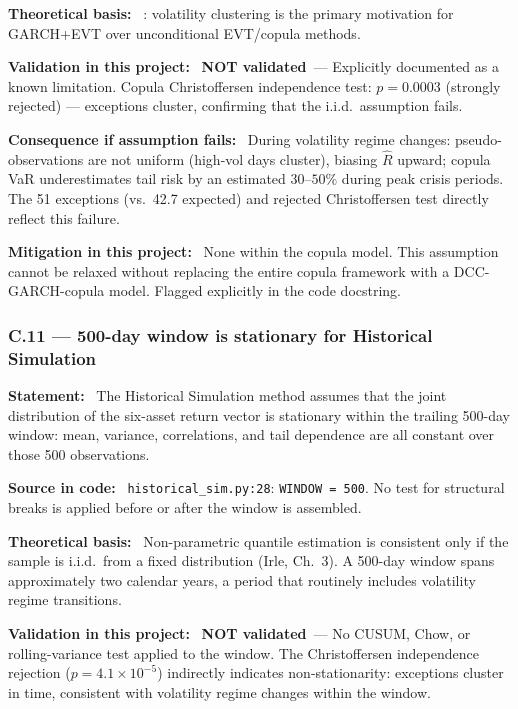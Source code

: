 \documentclass[11pt,a4paper]{article}
\newcommand{\asmfield}[1]{\medskip\noindent\textbf{#1:}\ }
\newcommand{\code}[1]{\texttt{#1}}
\newcommand{\notvalidated}{\textbf{NOT validated}}
\begin{document}
\asmfield{Theoretical basis}
\cite{McNeilFrey2000}: volatility clustering is the primary motivation for
GARCH+EVT over unconditional EVT/copula methods.

\asmfield{Validation in this project}
\notvalidated\ --- Explicitly documented as a known limitation. Copula
Christoffersen independence test: $p = 0.0003$ (strongly rejected) ---
exceptions cluster, confirming that the i.i.d.\ assumption fails.

\asmfield{Consequence if assumption fails}
During volatility regime changes: pseudo-observations are not uniform (high-vol
days cluster), biasing $\hat{R}$ upward; copula VaR underestimates tail
risk by an estimated $30$--$50\%$ during peak crisis periods. The 51
exceptions (vs.\ 42.7 expected) and rejected Christoffersen test directly
reflect this failure.

\asmfield{Mitigation in this project}
None within the copula model. This assumption cannot be relaxed without
replacing the entire copula framework with a DCC-GARCH-copula model.
Flagged explicitly in the code docstring.

\subsubsection{C.11 --- 500-day window is stationary for Historical Simulation}\label{asm:C11}

\asmfield{Statement}
The Historical Simulation method assumes that the joint distribution of
the six-asset return vector is stationary within the trailing 500-day
window: mean, variance, correlations, and tail dependence are all constant
over those 500 observations.

\asmfield{Source in code}
\code{historical\_sim.py:28}: \lstinline|WINDOW = 500|. No test for
structural breaks is applied before or after the window is assembled.

\asmfield{Theoretical basis}
Non-parametric quantile estimation is consistent only if the sample is
i.i.d.\ from a fixed distribution (Irle, Ch.~3). A 500-day window spans
approximately two calendar years, a period that routinely includes
volatility regime transitions.

\asmfield{Validation in this project}
\notvalidated\ --- No CUSUM, Chow, or rolling-variance test applied to
the window. The Christoffersen independence rejection
($p = 4.1 \times 10^{-5}$) indirectly indicates non-stationarity:
exceptions cluster in time, consistent with volatility regime changes
within the window.
\end{document}
